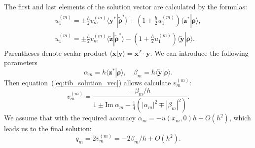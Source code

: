 The first and last elements of the solution vector are calculated by the formulas:
\begin{eqnarray}
    u_1^{(m)} = \pm \frac{h}{2} v_m^{(m)} \langle \mathbf{y}^{*} | \tilde{\mathbf{\rho}}^{*} \rangle
    \mp \left( 1 + \frac{h}{2} u_1^{(m)} \right) \langle \mathbf{z}^{*} | \mathbf{\rho} \rangle
    {,} \nonumber \\
    u_1^{(m)} = \pm \frac{h}{2} v_m^{(m)} \langle \tilde{\mathbf{z}} | \tilde{\mathbf{\rho}}^{*} \rangle
    - \left( 1 + \frac{h}{2} u_1^{(m)} \right) \langle \tilde{\mathbf{y}} | \mathbf{\rho} \rangle
    {.}
    \label{eq:tib_solution_vec}
\end{eqnarray}
Parentheses denote scalar product
$ \langle \mathbf{x} | \mathbf{y} \rangle = \mathbf{x}^{T} \cdot \mathbf{y} $.
We can introduce the following parameters
\begin{equation}
    \alpha_m = h \langle \mathbf{z}^{*} | \mathbf{\rho} \rangle {,} \quad
    \beta_m = h \langle \tilde{\mathbf{y}} | \mathbf{\rho} \rangle {.}
\end{equation}
Then equation~(\ref{eq:tib_solution_vec}) allows calculate $v^{(m)}_{m}$:
\begin{equation}
    v_m^{(m)} = \frac{ -\beta_m / h}
    {1 \pm \mathrm{Im} \ \alpha_m - \frac{1}{4}(|\alpha_m|^2 \mp |\beta_m|^2)} {.}
\end{equation}
We assume that with the required accuracy $ \alpha_m = -u (x_m, 0) h + O (h^2) $, which leads us to the final solution:
\begin{equation}
    q_m = 2 v_{m}^{(m)} = -2 \beta_m / h + O(h^2) {.}
\end{equation}

